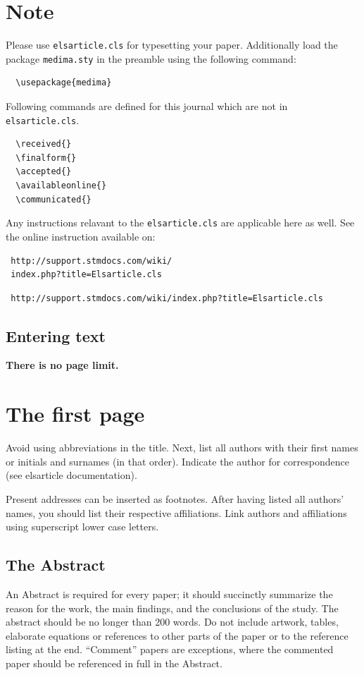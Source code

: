 \documentclass[times,twocolumn,final]{elsarticle}
\begin{document}

\section{Note}
\label{sec1}
Please use \verb+elsarticle.cls+ for typesetting your paper.
Additionally load the package \verb+medima.sty+ in the preamble using
the following command: 
\begin{verbatim} 
  \usepackage{medima}
\end{verbatim}

Following commands are defined for this journal which are not in
\verb+elsarticle.cls+. 
\begin{verbatim}
  \received{}
  \finalform{}
  \accepted{}
  \availableonline{}
  \communicated{}
\end{verbatim}

Any instructions relavant to the \verb+elsarticle.cls+ are applicable
here as well. See the online instruction available on:
\makeatletter
\if@twocolumn
\begin{verbatim}
 http://support.stmdocs.com/wiki/
 index.php?title=Elsarticle.cls
\end{verbatim}
\else
\begin{verbatim}
 http://support.stmdocs.com/wiki/index.php?title=Elsarticle.cls
\end{verbatim}
\fi

\subsection{Entering text}
\textcolor{newcolor}{\bf There is no page limit.}

\section{The first page}
Avoid using abbreviations in the title. Next, list all authors with
their first names or initials and surnames (in that order). Indicate
the author for correspondence (see elsarticle documentation).

Present addresses can be inserted as footnotes. After having listed all
authors' names, you should list their respective affiliations. Link
authors and affiliations using superscript lower case letters.

\subsection{The Abstract}
An Abstract is required for every paper; it should succinctly summarize
the reason for the work, the main findings, and the conclusions of the
study. The abstract should be no longer than 200 words. Do not include
artwork, tables, elaborate equations or references to other parts of
the paper or to the reference listing at the end. ``Comment'' papers
are exceptions, where the commented paper should be referenced in full
in the Abstract.
\end{document}
